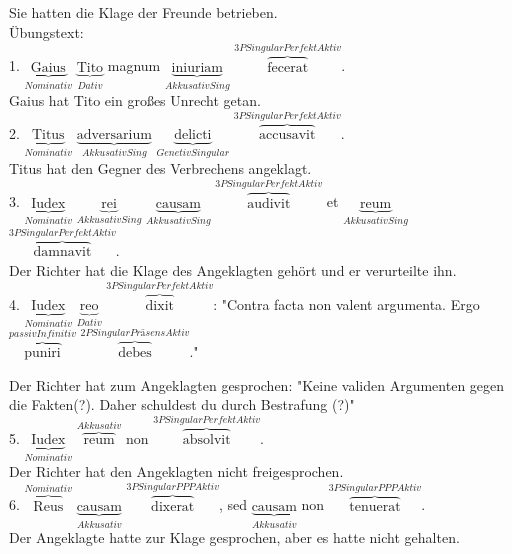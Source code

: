 \documentclass[a4paper]{article}
\newcommand{\ann}[2]{$\underbrace{\text{#1}}_{#2}$}
\newcommand{\ovv}[2]{$\overbrace{\text{#1}}^{#2}$}
\begin{document}
Sie hatten die Klage der Freunde betrieben. \\

Übungstext: \\

1. \ann{Gaius}{Nominativ} \ann{Tito}{Dativ} magnum \ann{iniuriam}{Akkusativ Sing} \ovv{fecerat}{3P Singular Perfekt Aktiv}. \\

Gaius hat Tito ein großes Unrecht getan. \\

2. \ann{Titus}{Nominativ} \ann{adversarium}{Akkusativ Sing} \ann{delicti}{Genetiv Singular} \ovv{accusavit}{3P Singular Perfekt Aktiv}. \\

Titus hat den Gegner des Verbrechens angeklagt. \\

3. \ann{Iudex}{Nominativ} \ann{rei}{Akkusativ Sing} \ann{causam}{Akkusativ Sing} \ovv{audivit}{3P Singular Perfekt Aktiv} et \ann{reum}{Akkusativ Sing} \ovv{damnavit}{3P Singular Perfekt Aktiv}. \\

Der Richter hat die Klage des Angeklagten gehört und er verurteilte ihn.\\

4. \ann{Iudex}{Nominativ} \ann{reo}{Dativ} \ovv{dixit}{3P Singular Perfekt Aktiv}: "Contra facta non valent argumenta. Ergo \ovv{puniri}{passiv Infinitiv} \ovv{debes}{2P Singular Präsens Aktiv}."

Der Richter hat zum Angeklagten gesprochen: "Keine validen Argumenten gegen die Fakten(?). Daher schuldest du durch Bestrafung (?)" \\

5. \ann{Iudex}{Nominativ} \ovv{reum}{Akkusativ} non \ovv{absolvit}{3P Singular Perfekt Aktiv}. \\ 

Der Richter hat den Angeklagten nicht freigesprochen. \\

6. \ovv{Reus}{Nominativ} \ann{causam}{Akkusativ} \ovv{dixerat}{3P Singular PPP Aktiv}, sed \ann{causam}{Akkusativ} non \ovv{tenuerat}{3P Singular PPP Aktiv}. \\

Der Angeklagte hatte zur Klage gesprochen, aber es hatte nicht gehalten.
\end{document}
